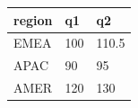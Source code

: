 \documentclass[11pt,a4paper]{article}
\begin{document}
\begin{table}[h]
\begin{tabular}{|l|l|l|}
\hline
region & q1 & q2 \\ \hline
EMEA & 100 & 110.5 \\ \hline
APAC & 90 & 95 \\ \hline
AMER & 120 & 130 \\ \hline
\end{tabular}
\end{table}
\end{document}
